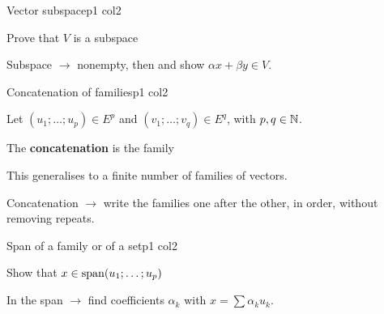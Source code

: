 \documentclass[sheet,noautoquant,noautokw]{neyvia-study}
\begin{document}
\begin{concept}[1.12]{Vector subspace}{p1 col2}
\begin{definition}
\end{definition}
\begin{method}{Prove that $V$ is a subspace}
\step{$\cdots$}
\end{method}
\begin{reflex}
Subspace \ensuremath{\rightarrow} nonempty, then  and show $\alpha x+\beta y\in V$.
\end{reflex}
\end{concept}
\begin{concept}[1.13]{Concatenation of families}{p1 col2}
\begin{definition}
\noindent Let $(u_1;\dots;u_p)\in E^p$ and $(v_1;\dots;v_q)\in E^q$, with $p,q\in\mathbb{N}$.
\par\noindent The \textbf{concatenation} is the family
\par\noindent This generalises to a finite number of families of vectors.
\end{definition}
\begin{reflex}
Concatenation \ensuremath{\rightarrow} write the families one after the other, in order, without removing repeats.
\end{reflex}
\end{concept}
\begin{concept}[1.14]{Span of a family or of a set}{p1 col2}
\begin{definition}
\end{definition}
\begin{method}{Show that $x\in\operatorname{span}(u_1;\dots;u_p)$}
\end{method}
\begin{reflex}
In the span \ensuremath{\rightarrow} find coefficients $\alpha_k$ with $x=\sum\alpha_k u_k$.
\end{reflex}
\end{concept}
\end{document}
